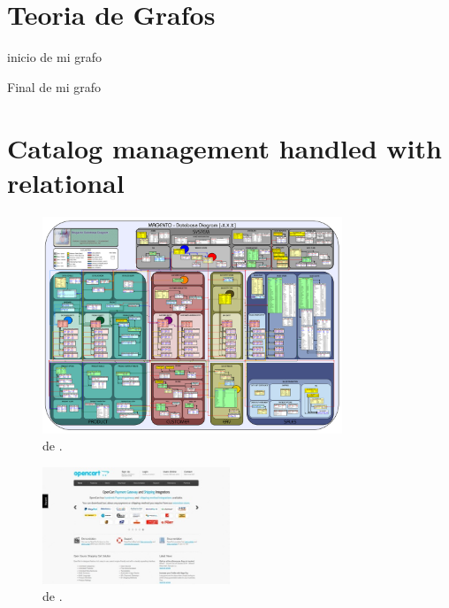 
\appendix
\newpage

\chapter{Teoria de Grafos}\label{ap:apendice_graph_theory}
inicio de mi grafo \cite{book_introduction_graph_theory}

Final de mi grafo

\chapter{Catalog management handled with relational \dataBasesDB}\label{ap:apendice_ecommerce_catalog_relational}

\begin{figure}[h!]
	\centering
	\includegraphics[width=0.8\textwidth]{figuras/apendice/magento_sample_database_diagram.png}
	\caption{\schemasDB de \nameMagento \ecommerce \frameworkPC.}
	\label{ap:figure:catalog_magento}
\end{figure}

\begin{figure}[h!]
	\centering
	\includegraphics[width=0.5\textwidth]{figuras/apendice/openCartWebsite.jpg}
	\caption{\schemasDB de \ofBizNAME.}
	\label{ap:figure:catalog_ofbiz}
\end{figure}

